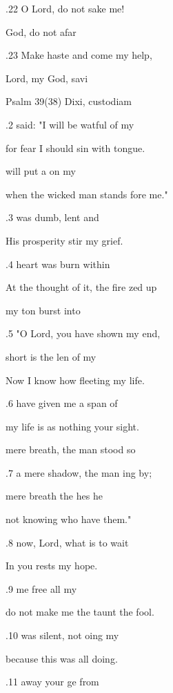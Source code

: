 .22 O Lord, do not sake me! 

 God, do not  afar  

.23 Make haste and come  my help, 

 Lord, my God,  savi 

Psalm 39(38) Dixi, custodiam 


.2  said: "I will be watful of my  

for fear I should sin with  tongue. 

 will put a  on my  

when the wicked man stands fore me." 

.3  was dumb, lent and  

His prosperity stir my grief. 

.4  heart was burn within  

At the thought of it, the fire zed up 

 my ton burst into  

.5 "O Lord, you have shown  my end, 

 short is the len of my  

Now I know how fleeting  my life. 

.6  have given me a  span of  

my life is as nothing  your sight. 

 mere breath, the man  stood so  

.7 a mere shadow, the man ing by; 

 mere breath the hes he  

not knowing who  have them." 

.8  now, Lord, what is  to wait  

In you rests  my hope. 

.9  me free  all my  

do not make me the taunt  the fool. 

.10  was silent, not oing my  

because this was all  doing. 

.11  away your ge from  

